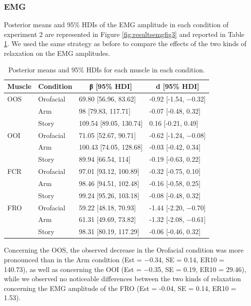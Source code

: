 \documentclass[a4paper,12pt,twoside,onecolumn,openright,final,oldfontcommands]{memoir}
\begin{document}
\hypertarget{emg-1}{%
\subsubsection{EMG}\label{emg-1}}

Posterior means and 95\% HDIs of the EMG amplitude in each condition of experiment 2 are represented in Figure \ref{fig:resultsemgfig3} and reported in Table \ref{tab:table3}. We used the same strategy as before to compare the effects of the two kinds of relaxation on the EMG amplitudes.

\begin{table}[H]
\begin{center}
\begin{threeparttable}
\caption{\label{tab:table3}Posterior means and 95\% HDIs for each muscle in each condition.}
\small{
\begin{tabular}{llll}
\toprule
Muscle & \multicolumn{1}{c}{Condition} & \multicolumn{1}{c}{β [95\% HDI]} & \multicolumn{1}{c}{d [95\% HDI]}\\
\midrule
OOS & Orofacial & 69.80 [56.96, 83.62] & -0.92 [-1.54, −0.32]\\
 & Arm & 98 [79.83, 117.71] & -0.07 [-0.48, 0.32]\\
 & Story & 109.54 [89.05, 130.74] & 0.16 [-0.21, 0.49]\\
OOI & Orofacial & 71.05 [52.67, 90.71] & -0.62 [-1.24, −0.08]\\
 & Arm & 100.43 [74.05, 128.68] & -0.03 [-0.42, 0.34]\\
 & Story & 89.94 [66.54, 114] & -0.19 [-0.63, 0.22]\\
FCR & Orofacial & 97.01 [93.12, 100.89] & -0.32 [-0.75, 0.10]\\
 & Arm & 98.46 [94.51, 102.48] & -0.16 [-0.58, 0.25]\\
 & Story & 99.24 [95.26, 103.18] & -0.08 [-0.48, 0.32]\\
FRO & Orofacial & 59.22 [48.18, 70.93] & -1.44 [-2.20, −0.70]\\
 & Arm & 61.31 [49.69, 73.82] & -1.32 [-2.08, −0.61]\\
 & Story & 98.31 [80.19, 117.29] & -0.06 [-0.46, 0.32]\\
\bottomrule
\end{tabular}
}
\end{threeparttable}
\end{center}
\end{table}

Concerning the OOS, the observed decrease in the Orofacial condition was more pronounced than in the Arm condition (Est = −0.34, SE = 0.14, ER10 = 140.73), as well as concerning the OOI (Est = −0.35, SE = 0.19, ER10 = 29.46), while we observed no noticeable differences between the two kinds of relaxation concerning the EMG amplitude of the FRO (Est = -0.04, SE = 0.14, ER10 = 1.53).
\end{document}

